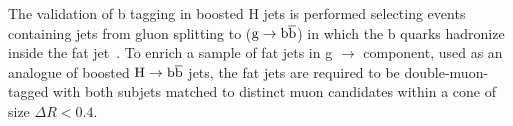 The validation of b tagging in boosted H jets is performed selecting events containing jets from gluon splitting to \bbbar ($\mathrm{g}\to{\mathrm{b}\overline{\mathrm{b}}}$) in which the b quarks hadronize inside the fat jet~\cite{CMS:BTV13001}.
To enrich a sample of fat jets in g $\to$ \bbbar component, used as an analogue of boosted $\mathrm{H}\to{\mathrm{b}\overline{\mathrm{b}}}$ jets, the fat jets are required to be double-muon-tagged with both subjets
matched to distinct muon candidates within a cone of size $\Delta R < 0.4$.
